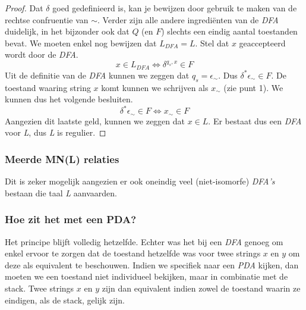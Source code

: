 \begin{proof}
  Dat $\delta$ goed gedefinieerd is, kan je bewijzen door gebruik te maken van de rechtse confruentie van $\sim$. Verder zijn alle andere ingredi\"enten van de \emph{DFA} duidelijk, in het bijzonder ook dat $Q$ (en $F$) slechts een eindig aantal toestanden bevat. We moeten enkel nog bewijzen dat $L_{DFA} = L$. Stel dat $x$ geaccepteerd wordt door de \emph{DFA}.
  $$x \in L_{DFA} \iff \delta^{q_s, x} \in F$$
  Uit de definitie van de \emph{DFA} kunnen we zeggen dat $q_s = \epsilon_{\sim}$. Dus $\delta^*{\epsilon_{\sim} \in F}$. De toestand waaring string $x$ komt kunnen we schrijven als $x_{\sim}$ (zie punt 1). We kunnen dus het volgende besluiten.
  $$\delta^*{\epsilon_{\sim}} \in F \iff x_{\sim} \in F$$
  Aangezien dit laatste geld, kunnen we zeggen dat $x \in L$. Er bestaat dus een \emph{DFA} voor \emph{L}, dus \emph{L} is regulier.
\end{proof}

\subsubsection*{Meerde MN(L) relaties}

Dit is zeker mogelijk aangezien er ook oneindig veel (niet-isomorfe) \emph{DFA's} bestaan die taal \emph{L} aanvaarden.

\subsubsection*{Hoe zit het met een PDA?}

Het principe blijft volledig hetzelfde. Echter was het bij een \emph{DFA} genoeg om enkel ervoor te zorgen dat de toestand hetzelfde was voor twee strings $x$ en $y$ om deze als equivalent te beschouwen. Indien we specifiek naar een \emph{PDA} kijken, dan moeten we een toestand niet individueel bekijken, maar in combinatie met de stack. Twee strings $x$ en $y$ zijn dan equivalent indien zowel de toestand waarin ze eindigen, als de stack, gelijk zijn.
